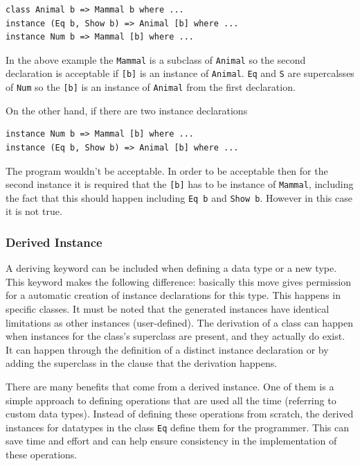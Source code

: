 \documentclass[a4paper, titlepage, twoside]{article}
\begin{document}
\begin{verbatim}
class Animal b => Mammal b where ...
instance (Eq b, Show b) => Animal [b] where ...
instance Num b => Mammal [b] where ...
\end{verbatim}

In the above example the \texttt{Mammal} is a subclass of \texttt{Animal} so the second declaration is acceptable if \texttt{[b]} is an instance of \texttt{Animal}. \texttt{Eq} and \texttt{S} are supercalsses of \texttt{Num} so the \texttt{[b]} is an instance of \texttt{Animal} from the first declaration.

On the other hand, if there are two instance declarations

\begin{verbatim}
instance Num b => Mammal [b] where ...
instance (Eq b, Show b) => Animal [b] where ...
\end{verbatim}

The program wouldn't be acceptable. In order to be acceptable then for the second instance it is required that the \texttt{[b]} has to be instance of \texttt{Mammal}, including the fact that this should happen including \texttt{Eq b} and \texttt{Show b}. However in this case it is not true.

\subsubsection{Derived Instance}
\label{sec:orge939f29}

A deriving keyword can be included when defining a data type or a new type. This keyword makes the following difference: basically this move gives permission for a automatic creation of instance declarations for this type. This happens in specific classes. It must be noted that the generated instances have identical limitations as other instances (user-defined). The derivation of a class can happen when instances for the class’s superclass are present, and they actually do exist. It can happen through the definition of a distinct instance declaration or by adding the superclass in the clause that the derivation happens.

There are many benefits that come from a derived instance. One of them is a simple approach to defining operations that are used all the time (referring to custom data types). Instead of defining these operations from scratch, the derived instances for datatypes in the class \texttt{Eq} define them for the programmer. This can save time and effort and can help ensure consistency in the implementation of these operations.
\end{document}
